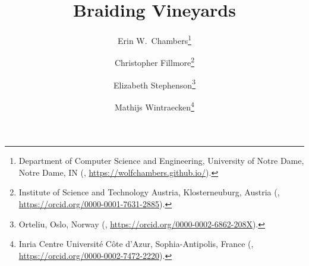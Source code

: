 \documentclass[twoside,leqno]{article}
\begin{document}
%
\newcommand\relatedversion{}
\renewcommand\relatedversion{\thanks{The full version of the paper can be accessed at \protect\url{https://arxiv.org/abs/0000.00000}}} %

\title{Braiding Vineyards}
    
\author{Erin W.~Chambers\thanks{Department of Computer Science and Engineering, University of Notre Dame, Notre Dame, IN (,  \url{https://wolfchambers.github.io/}).}
\and Christopher Fillmore\thanks{Institute of Science and Technology Austria, Klosterneuburg, Austria (,  \url{https://orcid.org/0000-0001-7631-2885}).}    
\and Elizabeth Stephenson\thanks{Orteliu, Oslo, Norway
(, \url{https://orcid.org/0000-0002-6862-208X}).}
\and Mathijs Wintraecken\thanks{Inria Centre Universit{\'e} C{\^o}te d'Azur, Sophia-Antipolis, France
(, \url{https://orcid.org/0000-0002-7472-2220}).}}



\date{}


\maketitle
\end{document}
